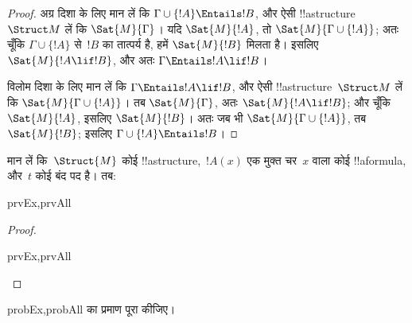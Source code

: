\documentclass[../../../include/open-logic-section]{subfiles}
\begin{document}
\begin{proof}
अग्र दिशा के लिए मान लें कि $\Gamma \cup \{ !A \} \Entails !B$, और ऐसी
!!a{structure}~$\Struct M$ लें कि $\Sat{M}{\Gamma}$। यदि $\Sat{M}{!A}$,
  तो $\Sat{M}{\Gamma \cup \{ !A \} }$; अतः चूँकि $\Gamma
\cup \{ !A \}$ से~$!B$ का तात्पर्य है, हमें $\Sat{M}{!B}$ मिलता है। इसलिए
$\Sat{M}{!A \lif !B}$, और अतः $\Gamma \Entails !A \lif !B$।

विलोम दिशा के लिए मान लें कि $\Gamma \Entails !A \lif !B$, और ऐसी
!!a{structure}~$\Struct M$ लें कि $\Sat{M}{\Gamma \cup \{ !A
  \}}$। तब
$\Sat{M}{\Gamma}$, अतः $\Sat{M}{!A \lif !B}$; और चूँकि $\Sat{M}{!A}$,
इसलिए $\Sat{M}{!B}$। अतः जब भी $\Sat{M}{\Gamma \cup \{
  !A \} }$, तब
$\Sat{M}{!B}$; इसलिए $\Gamma \cup \{ !A \} \Entails !B$।
\end{proof}

\begin{prop}
  मान लें कि~$\Struct{M}$ कोई !!a{structure},~$!A(x)$ एक मुक्त चर~$x$ वाला
  कोई !!a{formula}, और~$t$ कोई बंद पद है। तब:
  \begin{tagenumerate}{prvEx,prvAll}
  \end{tagenumerate}
\end{prop}

\begin{proof}
  \begin{tagenumerate}{prvEx,prvAll}
  \end{tagenumerate}
\end{proof}

\begin{probtag}{probEx,probAll}
   का प्रमाण पूरा कीजिए।
\end{probtag}
\end{document}
